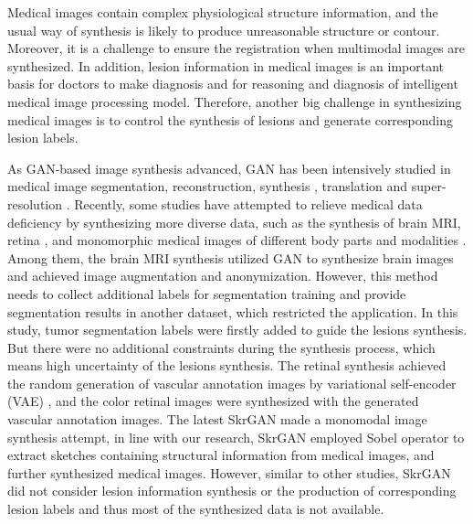 \documentclass[runningheads]{llncs}
\begin{document}
	 Medical images contain complex physiological structure information, and the usual way of synthesis is likely to produce unreasonable structure or contour. Moreover, it is a challenge to ensure the registration when multimodal images are synthesized. In addition, lesion information in medical images is an important basis for doctors to make diagnosis and for reasoning and diagnosis of intelligent medical image processing model. Therefore, another big challenge in synthesizing medical images is to control the synthesis of lesions and generate corresponding lesion labels.

	As GAN-based image synthesis advanced, GAN has been intensively studied in medical image segmentation\cite{40kamnitsas2017unsupervised}, reconstruction\cite{61fan2018a,65anirudh2018lose}, synthesis \cite{41costa2017towards,4shin2018medical,43iglesias2013is,44shrivastava2017learning}, translation \cite{2zhang2018translating,20nie2017medical,35osokin2017gans,36vannguyen2015crossdomain,40kamnitsas2017unsupervised,136yi2018sharpness-aware,137yang2018low-dose,138WolterinkGenerative} and super-resolution \cite{14You2018CT,15lyu2018super-resolution}.
	Recently, some studies have attempted to relieve medical data deficiency by synthesizing more diverse data, such as the synthesis of brain MRI\cite{4shin2018medical}, retina \cite{41costa2017towards}, and monomorphic medical images of different body parts and modalities \cite{96zhang2019skrgan:}. Among them, the brain MRI synthesis \cite{4shin2018medical} utilized GAN to synthesize brain images and achieved image augmentation and anonymization. However, this method needs to collect additional labels for segmentation training and provide segmentation results in another dataset, which restricted the application. In this study, tumor segmentation labels were firstly added to guide the lesions synthesis. But there were no additional constraints during the synthesis process, which means high uncertainty of the lesions synthesis. The retinal synthesis \cite{41costa2017towards} achieved the random generation of vascular annotation images by variational self-encoder (VAE) \cite{87kingma2014auto-encoding,88rezende2014stochastic}, and the color retinal images were synthesized with the generated vascular annotation images. The latest SkrGAN\cite{96zhang2019skrgan:} made a monomodal image synthesis attempt, in line with our research, SkrGAN employed Sobel operator to extract sketches containing structural information from medical images, and further synthesized medical images. However, similar to other studies, SkrGAN did not consider lesion information synthesis or the production of corresponding lesion labels and thus most of the synthesized data is not available.
	
\end{document}
